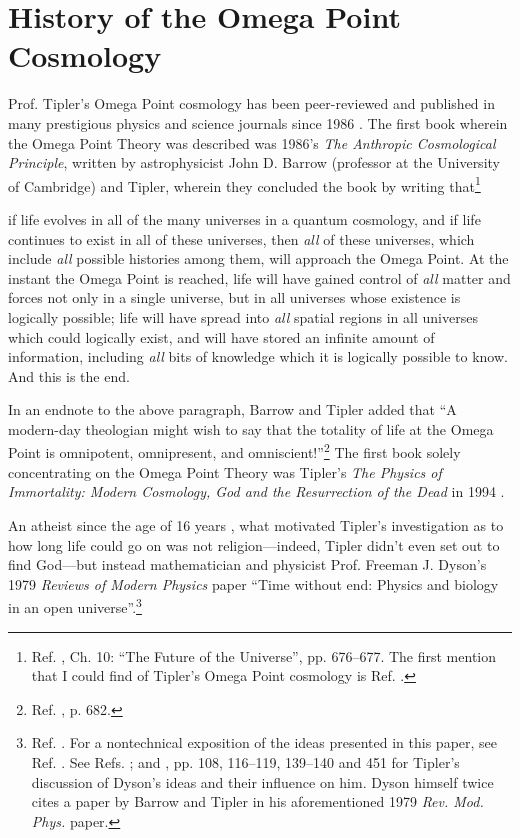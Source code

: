 \documentclass[letterpaper,12pt]{article}
\newenvironment{squote}
  {\small\quote}
  {\endquote\normalsize}
\begin{document}
\section{History of the Omega Point Cosmology}
\label{sec:HistoryOPC}

Prof. Tipler's Omega Point cosmology has been peer-reviewed and published in many prestigious physics and science journals since 1986 \cite{Tipler1986,Tipler1987b,Tipler1987c,Tipler1988,Tipler1989,Tipler1992,Tipler1993,Tipler1997,Tipler1998,TiplerEtAl2000,Tipler2000b,Tipler2003a,Tipler2005}. The first book wherein the Omega Point Theory was described was 1986's \emph{The Anthropic Cosmological Principle}, written by astrophysicist John D. Barrow (professor at the University of Cambridge) and Tipler, wherein they concluded the book by writing that\footnote{Ref. , Ch. 10: ``The Future of the Universe'', pp. 676--677. The first mention that I could find of Tipler's Omega Point cosmology is Ref. .}

\begin{squote}
if life evolves in all of the many universes in a quantum cosmology, and if life continues to exist in all of these universes, then \emph{all} of these universes, which include \emph{all} possible histories among them, will approach the Omega Point. At the instant the Omega Point is reached, life will have gained control of \emph{all} matter and forces not only in a single universe, but in all universes whose existence is logically possible; life will have spread into \emph{all} spatial regions in all universes which could logically exist, and will have stored an infinite amount of information, including \emph{all} bits of knowledge which it is logically possible to know. And this is the end.
\end{squote}

In an endnote to the above paragraph, Barrow and Tipler added that ``A modern-day theologian might wish to say that the totality of life at the Omega Point is omnipotent, omnipresent, and omniscient!''\footnote{Ref. , p. 682.} The first book solely concentrating on the Omega Point Theory was Tipler's \emph{The Physics of Immortality: Modern Cosmology, God and the Resurrection of the Dead} in 1994 \cite{Tipler1994}.

An atheist since the age of 16 years \cite{Garber2010}, what motivated Tipler's investigation as to how long life could go on was not religion---indeed, Tipler didn't even set out to find God---but instead mathematician and physicist Prof. Freeman J. Dyson's 1979 \emph{Reviews of Modern Physics} paper ``Time without end: Physics and biology in an open universe''.\footnote{Ref. . For a nontechnical exposition of the ideas presented in this paper, see Ref. . See Refs. ; and , pp. 108, 116--119, 139--140 and 451 for Tipler's discussion of Dyson's ideas and their influence on him. Dyson himself twice cites a paper by Barrow and Tipler \cite{BarrowTipler1978} in his aforementioned 1979 \emph{Rev. Mod. Phys.} paper.}
\end{document}
